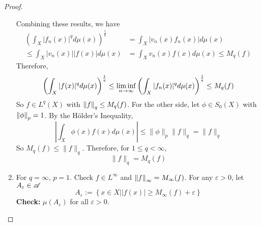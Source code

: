 \begin{proof}
\begin{enumerate}[label=(\roman*)]
		\noindent Combining these results, we have
		\begin{equation*}
			\begin{aligned}
				\left(\int_X\left|f_n(x)\right|^q d \mu(x)\right)^{\frac{1}{q}} & =\int_X\left|v_n(x) f_n(x)\right| d \mu(x) \\
				\leq \int_X\left|v_n(x)\right||f(x)| d \mu(x) & =\int_X v_n(x) f(x) d \mu(x) \leq M_q(f)
			\end{aligned}
		\end{equation*}
		Therefore,
		\begin{equation*}
			\left(\int_X|f(x)|^q d \mu(x)\right)^{\frac{1}{q}} \leq \liminf_{n \rightarrow \infty} \left(\int_X|f_n(x)|^q d \mu(x)\right)^{\frac{1}{q}} \leq M_q(f)
		\end{equation*}
		So $f \in L^q(X)$ with $\left\lVert f\right\lVert_q \leq M_q(f)$. For the other side, let $\phi \in S_0(X)$ with $\left\lVert\phi\right\lVert_p =1$. By the H\"older's Inequality,
		\begin{equation*}
			\left|\int_X \phi(x) f(x) d \mu(x)\right| \leq\|\phi\|_{p}\|f\|_{q}=\|f\|_{q}
		\end{equation*}
		So $M_q(f) \leq\|f\|_{q}$. Therefore, for $1 \leq q < \infty$,
		\begin{equation*}
			\|f\|_{q}=M_q(f)
		\end{equation*}


		\item For $q = \infty$, $p = 1$. Check $f \in L^\infty$ and $\left\lVert f\right\lVert_\infty = M_\infty(f)$. For any $\varepsilon > 0$, let $A_\varepsilon \in \mathscr{A}$
		\begin{equation*}
			A_{\varepsilon}:=\left\{x \in X| | f(x) \mid \geq M_{\infty}(f)+\varepsilon\right\}
		\end{equation*}
		\textbf{Check:} $\mu(A_{\varepsilon})$ for all $\varepsilon > 0$.


\end{enumerate}
\end{proof}
